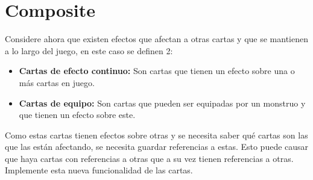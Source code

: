 \section{Composite}
  \begin{Exercise}[title={Cartas de efecto continuo}, label={ex:composite-1}]
    Considere ahora que existen efectos que afectan a otras cartas y que se mantienen a lo
    largo del juego, en este caso se definen 2:
    \begin{itemize}
      \item \textbf{Cartas de efecto continuo:} Son cartas que tienen un efecto sobre una 
        o más cartas en juego.
      \item \textbf{Cartas de equipo:} Son cartas que pueden ser equipadas por un monstruo 
        y que tienen un efecto sobre este.
    \end{itemize}

    Como estas cartas tienen efectos sobre otras y se necesita saber qué cartas son las 
    que las están afectando, se necesita guardar referencias a estas.
    Esto puede causar que haya cartas con referencias a otras que a su vez tienen 
    referencias a otras.
    Implemente esta nueva funcionalidad de las cartas. 
  \end{Exercise}
%